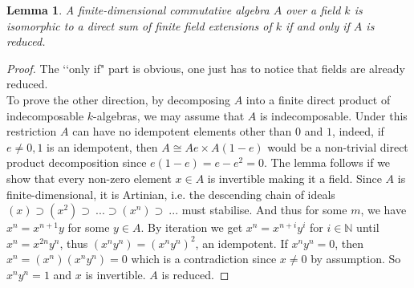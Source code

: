 \documentclass{article}
\theoremstyle{plain}
\newtheorem{lemma}[theorem]{Lemma}
\theoremstyle{definition}
\begin{document}
\begin{lemma}
\label{finite_dimensional_direct_sum_reduced}
    A finite-dimensional commutative algebra $A$ over a field $k$ is isomorphic to a direct sum of finite field extensions of $k$ if and only if $A$ is reduced.
\end{lemma}
\begin{proof}
    The ‘‘only if" part is obvious, one just has to notice that fields are already reduced. \\
    To prove the other direction, by decomposing $A$ into a finite direct product of indecomposable $k$-algebras, we may assume that $A$ is indecomposable.
    Under this restriction $A$ can have no idempotent elements other than $0$ and $1$, indeed, if $e\neq 0,1$ is an idempotent, then $A \cong Ae \times A(1-e)$ would be a non-trivial direct product decomposition since $e(1-e)=e-e^2=0$.
    The lemma follows if we show that every non-zero element $x\in A$ is invertible making it a field.
    Since $A$ is finite-dimensional, it is Artinian, i.e. the descending chain of ideals $(x)\supset (x^2)\supset\: ... \supset (x^n)\supset\:...$ must stabilise.
    And thus for some $m$, we have $x^n = x^{n+1}y$ for some $y\in A$.
    By iteration we get $x^n = x^{n+i}y^i$ for $i\in\mathbb{N}$ until $x^n = x^{2n}y^n$, thus $(x^ny^n)=(x^ny^n)^2$, an idempotent. 
    If $x^ny^n=0$, then $x^n = (x^n)(x^ny^n) = 0$ which is a contradiction since $x\neq 0$ by assumption. So $x^ny^n=1$ and $x$ is invertible. $A$ is reduced.
\end{proof}
\end{document}
